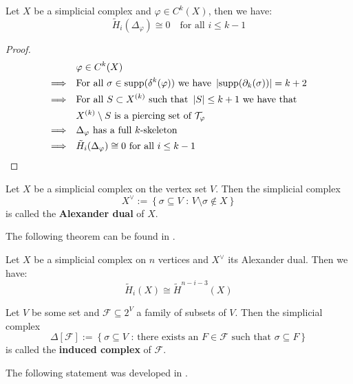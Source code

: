 %      

\begin{thm}
Let \(X\) be a simplicial complex and \(\varphi\in C^k(X)\), then we have:
\[
\tilde{H}_i(\Delta_{\varphi})\cong 0\quad\text{for all }i\leq k-1
\]
\begin{proof}
\begin{align*}
& \varphi\in C^k(X) \\
\Longrightarrow \quad & \text{For all }\sigma\in \mathrm{supp}(\delta^k(\varphi))\text{ we have }\left|\mathrm{supp}(\partial_k(\sigma))\right|=k+2 \\
\Longrightarrow \quad & \text{For all }S\subset X^{(k)}\text{ such that }\left|S\right|\leq k+1\text{ we have that } \\ & X^{(k)}\setminus S\text{ is a piercing set of }\mathcal{T}_{\varphi} \\
\Longrightarrow \quad & \Delta_{\varphi}\text{ has a full }k\text{-skeleton} \\
\Longrightarrow \quad & \tilde{H}_i(\Delta_{\varphi})\cong 0\text{ for all }i\leq k-1
\end{align*}
\end{proof}
\end{thm}

\begin{defi}
Let \(X\) be a simplicial complex on the vertex set \(V\). Then the simplicial complex
\[
X^{\lor}:=\left\{\sigma\subseteq V\text{ : }V\setminus\sigma\notin X\right\}
\]
is called the \textbf{Alexander dual} of \(X\).
\end{defi}

The following theorem can be found in \cite{8}.

\begin{thm}\label{theorem12}
Let \(X\) be a simplicial complex on \(n\) vertices and \(X^{\lor}\) its Alexander dual. Then we have:
\[
\tilde{H}_i(X)\cong\tilde{H}^{n-i-3}(X)
\]
\end{thm}

\begin{defi}
Let \(V\) be some set and \(\mathcal{F}\subseteq 2^V\) a family of subsets of \(V\). Then the simplicial complex
\[
\Delta\left[\mathcal{F}\right]:=\left\{\sigma\subseteq V\text{ : there exists an }F\in\mathcal{F}\text{ such that }\sigma\subseteq F\right\}
\]
is called the \textbf{induced complex} of \(\mathcal{F}\). 
\end{defi}

The following statement was developed in \cite{9}.

